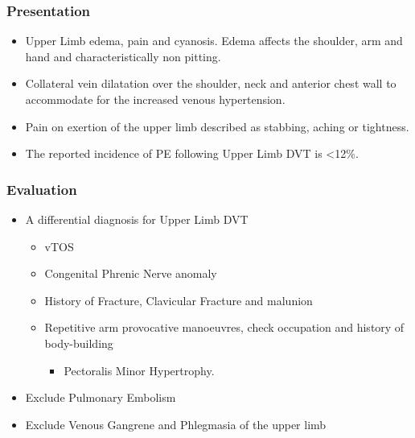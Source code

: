 \documentclass[
]{book}
\providecommand{\tightlist}{%
  \setlength{\itemsep}{0pt}\setlength{\parskip}{0pt}}
\begin{document}
\hypertarget{presentation-6}{%
\subsubsection{Presentation}\label{presentation-6}}

\begin{itemize}
\item
  Upper Limb edema, pain and cyanosis. Edema affects the shoulder, arm
  and hand and characteristically non pitting.
\item
  Collateral vein dilatation over the shoulder, neck and anterior
  chest wall to accommodate for the increased venous hypertension.
  \citep{humphries123ThoracicOutlet2019}
\item
  Pain on exertion of the upper limb described as stabbing, aching or
  tightness.
\item
  The reported incidence of PE following Upper Limb DVT is \textless12\%.
  \citep{humphries123ThoracicOutlet2019}
\end{itemize}

\hypertarget{evaluation-10}{%
\subsubsection{Evaluation}\label{evaluation-10}}

\begin{itemize}
\item
  A differential diagnosis for Upper Limb DVT

  \begin{itemize}
  \item
    vTOS
  \item
    Congenital Phrenic Nerve anomaly
  \item
    History of Fracture, Clavicular Fracture and malunion
  \item
    Repetitive arm provocative manoeuvres, check occupation and
    history of body-building

    \begin{itemize}
    \tightlist
    \item
      Pectoralis Minor Hypertrophy.
    \end{itemize}
  \end{itemize}
\item
  Exclude Pulmonary Embolism
\item
  Exclude Venous Gangrene and Phlegmasia of the upper limb
\end{itemize}
\end{document}
